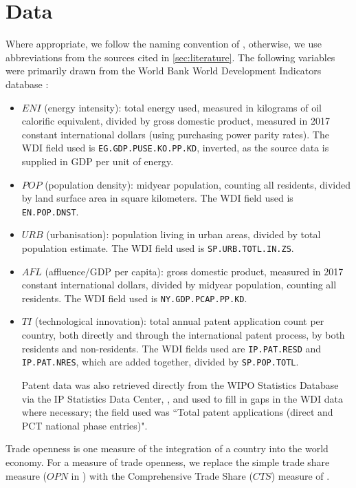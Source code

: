 \documentclass[12pt,a4paper]{article}
\begin{document}
\section{Data}\label{sec:data}
Where appropriate, we follow the naming convention of \cite{rafiqUrbanizationOpennessEmissions2016}, otherwise, we use abbreviations from the sources cited in \cref{sec:literature}.
The following variables were primarily drawn from the World Bank World Development Indicators database \citep{theworldbankWorldDevelopmentIndicators2019}:
\begin{itemize}
\item $ENI$ (energy intensity): total energy used, measured in kilograms of oil calorific equivalent, divided by gross domestic product, measured in 2017 constant international dollars (using purchasing power parity rates).
The WDI field used is \texttt{EG.GDP.PUSE.KO.PP.KD}, inverted, as the source data is supplied in GDP per unit of energy.
\item $POP$ (population density): midyear population, counting all residents, divided by land surface area in square kilometers. The WDI field used is \texttt{EN.POP.DNST}.
\item $URB$ (urbanisation): population living in urban areas, divided by total population estimate. The WDI field used is \texttt{SP.URB.TOTL.IN.ZS}.
\item $AFL$ (affluence/GDP per capita): gross domestic product, measured in 2017 constant international dollars, divided by midyear population, counting all residents. The WDI field used is \texttt{NY.GDP.PCAP.PP.KD}.
\item $TI$ (technological innovation): total annual patent application count per country, both directly and through the international patent process, by both residents and non-residents. The WDI fields used are \texttt{IP.PAT.RESD} and \texttt{IP.PAT.NRES}, which are added together, divided by \texttt{SP.POP.TOTL}.

Patent data was also retrieved directly from the WIPO Statistics Database via the IP Statistics Data Center, \cite{wipoWIPOStatisticsDatabase2020}, and used to fill in gaps in the WDI data where necessary; the field used was ``Total patent applications (direct and PCT national phase entries)".
 
\end{itemize}
Trade openness is one measure of the integration of a country into the world economy. 
For a measure of trade openness, we replace the simple trade share measure ($OPN$ in \citealt{rafiqUrbanizationOpennessEmissions2016}) with the Comprehensive Trade Share  ($CTS$) measure of \cite{squalliNewMeasureTrade2011}.
\end{document}

